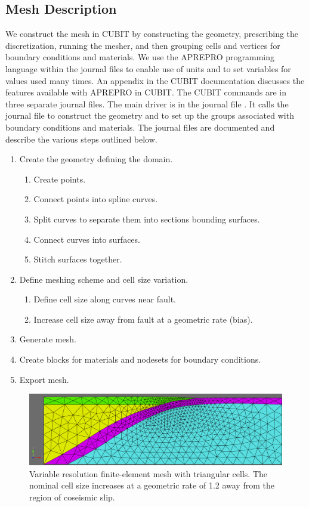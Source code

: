 \subsection{Mesh Description}

We construct the mesh in CUBIT by constructing the geometry, prescribing
the discretization, running the mesher, and then grouping cells and
vertices for boundary conditions and materials. We use the APREPRO
programming language within the journal files to enable use of units
and to set variables for values used many times. An appendix in the
CUBIT documentation discusses the features available with APREPRO
in CUBIT. The CUBIT commands are in three separate journal files.
The main driver is in the journal file . It
calls the journal file  to construct the geometry
and  to set up the groups associated with boundary
conditions and materials. The journal files are documented and describe
the various steps outlined below.
\begin{enumerate}
\item Create the geometry defining the domain.
  \begin{enumerate}
  \item Create points.
  \item Connect points into spline curves.
  \item Split curves to separate them into sections bounding surfaces. 
  \item Connect curves into surfaces.
  \item Stitch surfaces together.
  \end{enumerate}
\item Define meshing scheme and cell size variation.
  \begin{enumerate}
  \item Define cell size along curves near fault.
  \item Increase cell size away from fault at a geometric rate (bias).
  \end{enumerate}
\item Generate mesh.
\item Create blocks for materials and nodesets for boundary conditions.
\item Export mesh.
\end{enumerate}

\begin{figure}
  \includegraphics[width=4.5in]{examples/figs/subduction_tri3}
  \caption{Variable resolution finite-element mesh with triangular
    cells. The nominal cell size increases at a geometric rate of 1.2
    away from the region of coseismic slip.}
  \label{fig:tutorial:subduction:mesh}
\end{figure}


